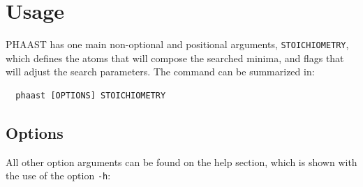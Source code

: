 \documentclass[
  article,
  12pt,
  oneside,
  english,
  brazil,
  sumario=abnt-6027-2012,
]{abntex2}
\let\oldsection\section
\renewcommand{\section}{\filbreak\oldsection}
\begin{document}
\imprimircapa

\section{Usage}

PHAAST has one main non-optional and positional arguments, \lstinline{STOICHIOMETRY}, which defines the atoms that will compose the searched minima, and flags that will adjust the search parameters.
The command can be summarized in:

\begin{lstlisting}
  phaast [OPTIONS] STOICHIOMETRY
\end{lstlisting}

\subsection{Options}
All other option arguments can be found on the help section, which is shown with the use of the option \lstinline{-h}:
\end{document}
